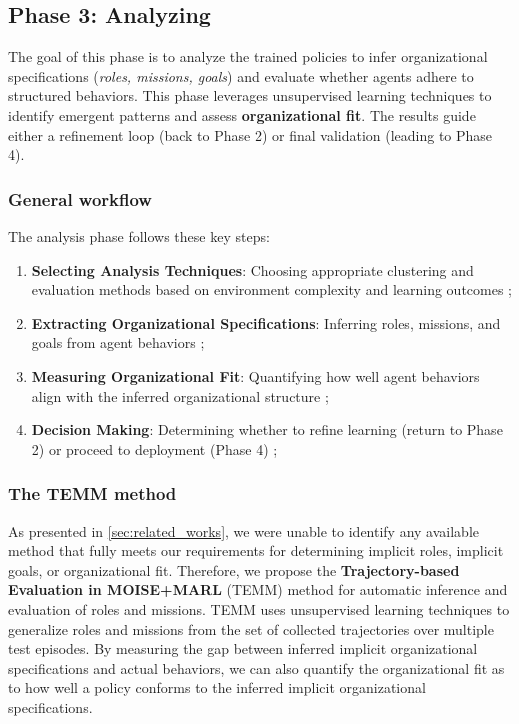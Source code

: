 \documentclass[pdflatex,sn-mathphys-num]{sn-jnl}%
\theoremstyle{thmstyleone}%
\theoremstyle{thmstyletwo}%
\theoremstyle{thmstylethree}%
\begin{document}
\subsection{Phase 3: Analyzing}

The goal of this phase is to analyze the trained policies to infer organizational specifications (\textit{roles, missions, goals}) and evaluate whether agents adhere to structured behaviors. This phase leverages unsupervised learning techniques to identify emergent patterns and assess \textbf{organizational fit}. The results guide either a refinement loop (back to Phase 2) or final validation (leading to Phase 4).

\subsubsection{General workflow}
The analysis phase follows these key steps:
\begin{enumerate}
    \item \textbf{Selecting Analysis Techniques}: Choosing appropriate clustering and evaluation methods based on environment complexity and learning outcomes ;
    \item \textbf{Extracting Organizational Specifications}: Inferring roles, missions, and goals from agent behaviors ;
    \item \textbf{Measuring Organizational Fit}: Quantifying how well agent behaviors align with the inferred organizational structure ;
    \item \textbf{Decision Making}: Determining whether to refine learning (return to Phase 2) or proceed to deployment (Phase 4) ;
\end{enumerate}

\subsubsection{The TEMM method}
\label{sec:TEMM_algorithm}

As presented in \autoref{sec:related_works}, we were unable to identify any available method that fully meets our requirements for determining implicit roles, implicit goals, or organizational fit. Therefore, we propose the \textbf{Trajectory-based Evaluation in MOISE+MARL} (TEMM) method for automatic inference and evaluation of roles and missions.
%
TEMM uses unsupervised learning techniques to generalize roles and missions from the set of collected trajectories over multiple test episodes. By measuring the gap between inferred implicit organizational specifications and actual behaviors, we can also quantify the organizational fit as to how well a policy conforms to the inferred implicit organizational specifications.
\end{document}

